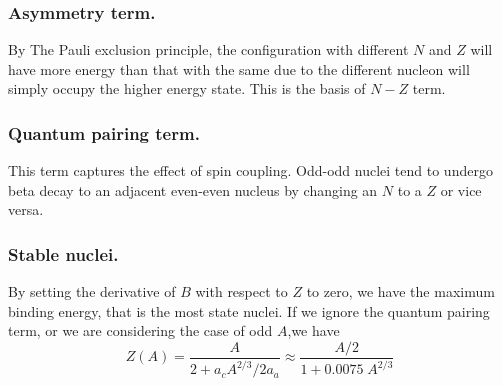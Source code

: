 \documentclass[../../../main.tex]{subfiles}
\begin{document}
\subsubsection*{Asymmetry term.} By The Pauli exclusion principle, the configuration with different $N$ and $Z$ will have more energy than that with the same due to the different nucleon will simply occupy the higher energy state. This is the basis of $N-Z$ term.

\subsubsection*{Quantum pairing term.} This term captures the effect of spin coupling. Odd-odd nuclei tend to undergo beta decay to an adjacent even-even nucleus by changing an $N$ to a $Z$ or vice versa.

\subsubsection*{Stable nuclei.} By setting the derivative of $B$ with respect to $Z$ to zero, we have the maximum binding energy, that is the most state nuclei. If we ignore the quantum pairing term, or we are considering the case of odd $A$,we have 
\begin{equation*}
    Z(A)=\frac{A}{2+a_cA^{2/3}/2a_a}\approx\frac{A/2}{1+0.0075\;A^{2/3}}
\end{equation*} 
\end{document}
